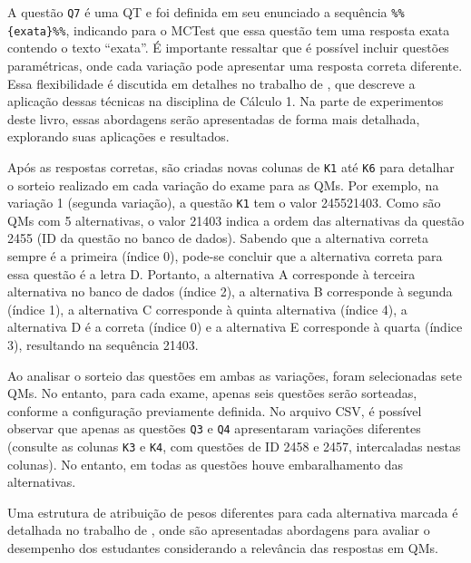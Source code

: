 A questão \verb|Q7| é uma QT e foi definida em seu enunciado a sequência \verb|%%{exata}%%|, indicando para o MCTest que essa questão tem uma resposta exata contendo o texto ``exata''. É importante ressaltar que é possível incluir questões paramétricas, onde cada variação pode apresentar uma resposta correta diferente. Essa flexibilidade é discutida em detalhes no trabalho de , que descreve a aplicação dessas técnicas na disciplina de Cálculo 1. Na parte de experimentos deste livro, essas abordagens serão apresentadas de forma mais detalhada, explorando suas aplicações e resultados.

Após as respostas corretas, são criadas novas colunas de \verb|K1| até \verb|K6| para detalhar o sorteio realizado em cada variação do exame para as QMs. Por exemplo, na variação 1 (segunda variação), a questão \verb|K1| tem o valor 245521403. Como são QMs com 5 alternativas, o valor 21403 indica a ordem das alternativas da questão 2455 (ID da questão no banco de dados). Sabendo que a alternativa correta sempre é a primeira (índice 0), pode-se concluir que a alternativa correta para essa questão é a letra D. Portanto, a alternativa A corresponde à terceira alternativa no banco de dados (índice 2), a alternativa B corresponde à segunda (índice 1), a alternativa C corresponde à quinta alternativa (índice 4), a alternativa D é a correta (índice 0) e a alternativa E corresponde à quarta (índice 3), resultando na sequência 21403. 

Ao analisar o sorteio das questões em ambas as variações, foram selecionadas sete QMs. No entanto, para cada exame, apenas seis questões serão sorteadas, conforme a configuração previamente definida. No arquivo CSV, é possível observar que apenas as questões \verb|Q3| e \verb|Q4| apresentaram variações diferentes (consulte as colunas \verb|K3| e \verb|K4|, com questões de ID 2458 e 2457, intercaladas nestas colunas). No entanto, em todas as questões houve embaralhamento das alternativas.

Uma estrutura de atribuição de pesos diferentes para cada alternativa marcada é detalhada no trabalho de  , onde são apresentadas abordagens para avaliar o desempenho dos estudantes considerando a relevância das respostas em QMs.

